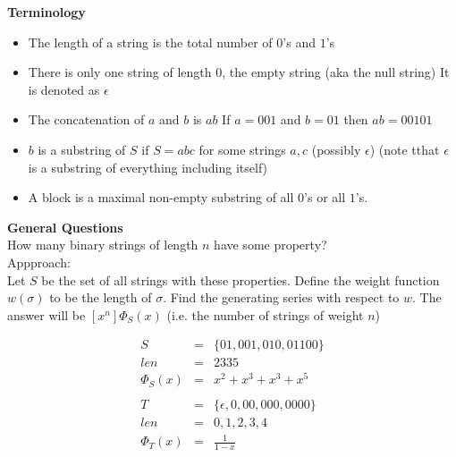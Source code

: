 \documentclass{article}
\begin{document}
\textbf{Terminology}
\begin{itemize}
	\item The length of a string is the total number of $0$'s and $1$'s
	\item There is only one string of length $0$, the empty string (aka the null string) It is denoted as $\epsilon$
	\item The concatenation of $a$ and $b$ is $ab$
		If $a=001$ and $b=01$ then $ab=00101$
	\item $b$ is a substring of $S$ if $S=abc$ for some strings $a,c$ (possibly $\epsilon$) (note tthat $\epsilon$ is a substring of everything including itself)
	\item A block is a maximal non-empty substring of all $0$'s or all $1$'s.
\end{itemize}

\textbf{General Questions}\\
How many binary strings of length $n$ have some property?\\
Appproach:\\
Let $S$ be the set of all strings with these properties. Define the weight function $w(\sigma)$ to be the length of $\sigma$. Find the generating series with respect to $w$. The answer will be $[x^n]\Phi_S(x)$ (i.e. the number of strings of weight $n$)

\example
\begin{eqnarray*}
	S &=&  \{01, 001, 010, 01100 \} \\
	len &=& 2 3 3 5 \\
	\Phi_S(x) &=& x^2 + x^3 + x^3 + x^5\\
	\\
	T &=&  \{\epsilon, 0, 00, 000, 0000 \} \\
	len &=& 0,1,2,3,4 \\
	\Phi_T(x) &=& \frac{1}{1-x}
\end{eqnarray*}
\end{document}
